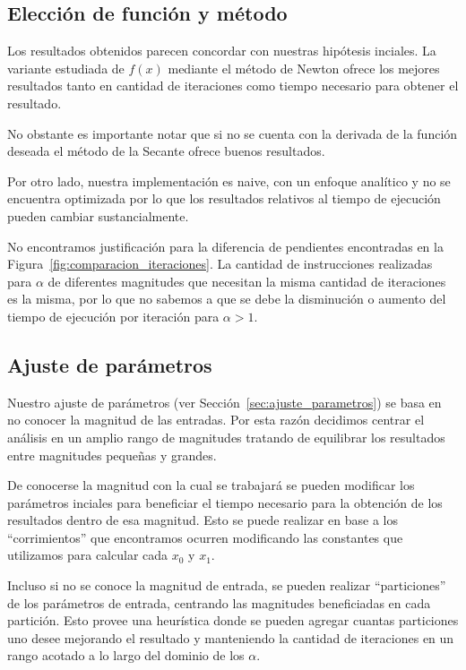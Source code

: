 \subsection{Elección de función y método}

Los resultados obtenidos parecen concordar con nuestras hipótesis inciales. La
variante estudiada de $f(x)$ mediante el método de Newton ofrece los mejores
resultados tanto en cantidad de iteraciones como tiempo necesario para obtener
el resultado.

No obstante es importante notar que si no se cuenta con la derivada de la
función deseada el método de la Secante ofrece buenos resultados.

Por otro lado, nuestra implementación es naive, con un enfoque analítico y no
se encuentra optimizada por lo que los resultados relativos al tiempo de
ejecución pueden cambiar sustancialmente.

No encontramos justificación para la diferencia de pendientes encontradas en la
Figura~\ref{fig:comparacion_iteraciones}. La cantidad de instrucciones
realizadas para $\alpha$ de diferentes magnitudes que necesitan la misma
cantidad de iteraciones es la misma, por lo que no sabemos a que se debe la
disminución o aumento del tiempo de ejecución por iteración para $\alpha > 1$.

\subsection{Ajuste de parámetros}

Nuestro ajuste de parámetros (ver Sección~\ref{sec:ajuste_parametros}) se basa
en no conocer la magnitud de las entradas. Por esta razón decidimos centrar el
análisis en un amplio rango de magnitudes tratando de equilibrar los resultados
entre magnitudes pequeñas y grandes.

De conocerse la magnitud con la cual se trabajará se pueden modificar los
parámetros inciales para beneficiar el tiempo necesario para la obtención de
los resultados dentro de esa magnitud. Esto se puede realizar en base a los
``corrimientos'' que encontramos ocurren modificando las constantes que
utilizamos para calcular cada $x_0$ y $x_1$.

Incluso si no se conoce la magnitud de entrada, se pueden realizar
``particiones'' de los parámetros de entrada, centrando las magnitudes
beneficiadas en cada partición. Esto provee una heurística donde se pueden
agregar cuantas particiones uno desee mejorando el resultado y manteniendo la
cantidad de iteraciones en un rango acotado a lo largo del dominio de los
$\alpha$.


